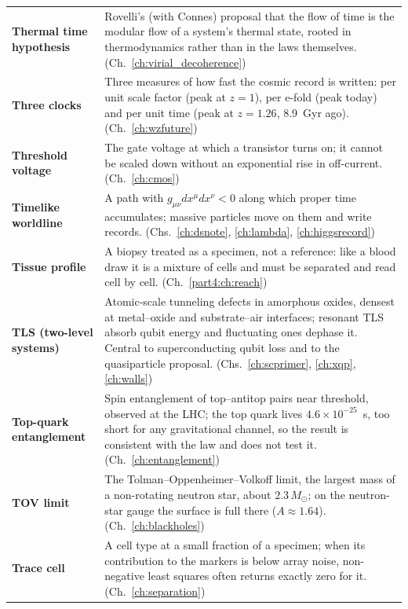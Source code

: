 {\begin{longtable}{@{}>{\raggedright\arraybackslash}p{}>{\raggedright\arraybackslash}p{}@{}}
\textbf{Thermal time hypothesis} & Rovelli's (with Connes) proposal that the flow of time is the modular flow of a system's thermal state, rooted in thermodynamics rather than in the laws themselves. {\footnotesize(Ch.~\ref{ch:virial_decoherence})}\\[1pt]
\textbf{Three clocks} & Three measures of how fast the cosmic record is written: per unit scale factor (peak at $z=1$), per e-fold (peak today) and per unit time (peak at $z=1.26$, 8.9~Gyr ago). {\footnotesize(Ch.~\ref{ch:wzfuture})}\\[1pt]
\textbf{Threshold voltage} & The gate voltage at which a transistor turns on; it cannot be scaled down without an exponential rise in off-current. {\footnotesize(Ch.~\ref{ch:cmos})}\\[1pt]
\textbf{Timelike worldline} & A path with $g_{\mu\nu}dx^\mu dx^\nu<0$ along which proper time accumulates; massive particles move on them and write records. {\footnotesize(Chs.~\ref{ch:dsnote}, \ref{ch:lambda}, \ref{ch:higgsrecord})}\\[1pt]
\textbf{Tissue profile} & A biopsy treated as a specimen, not a reference: like a blood draw it is a mixture of cells and must be separated and read cell by cell. {\footnotesize(Ch.~\ref{part4:ch:reach})}\\[1pt]
\textbf{TLS (two-level systems)} & Atomic-scale tunneling defects in amorphous oxides, densest at metal--oxide and substrate--air interfaces; resonant TLS absorb qubit energy and fluctuating ones dephase it. Central to superconducting qubit loss and to the quasiparticle proposal. {\footnotesize(Chs.~\ref{ch:scprimer}, \ref{ch:xqp}, \ref{ch:walls})}\\[1pt]
\textbf{Top-quark entanglement} & Spin entanglement of top--antitop pairs near threshold, observed at the LHC; the top quark lives $4.6\times10^{-25}$~s, too short for any gravitational channel, so the result is consistent with the law and does not test it. {\footnotesize(Ch.~\ref{ch:entanglement})}\\[1pt]
\textbf{TOV limit} & The Tolman--Oppenheimer--Volkoff limit, the largest mass of a non-rotating neutron star, about $2.3\,M_\odot$; on the neutron-star gauge the surface is full there ($A\approx1.64$). {\footnotesize(Ch.~\ref{ch:blackholes})}\\[1pt]
\textbf{Trace cell} & A cell type at a small fraction of a specimen; when its contribution to the markers is below array noise, non-negative least squares often returns exactly zero for it. {\footnotesize(Ch.~\ref{ch:separation})}\\[1pt]

\end{longtable}}
